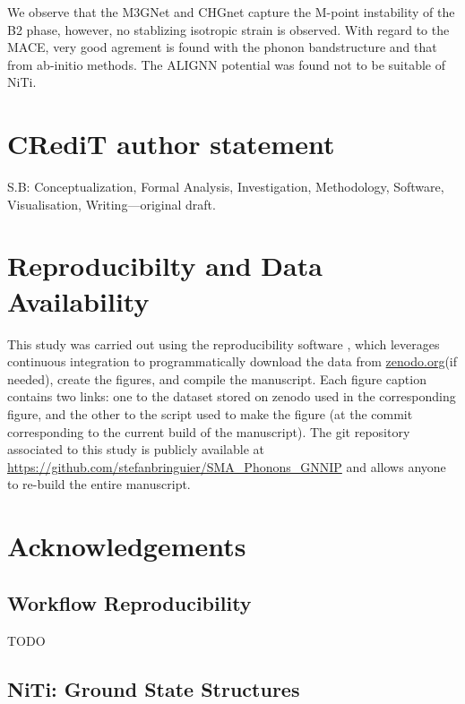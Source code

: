 \documentclass[preprint]{elsarticle}
\begin{document}
We observe that the M3GNet and CHGnet capture the M-point instability of the B2 phase, however, no stablizing isotropic strain is observed. With regard to the MACE, very good agrement is found with the phonon bandstructure and that from ab-initio methods. The ALIGNN potential was found not to be suitable of NiTi.






\section*{CR\lowercase{e}d\lowercase{i}T author statement}

S.B: Conceptualization, Formal Analysis, Investigation, Methodology, Software, Visualisation, Writing---original draft.


\section*{Reproducibilty and Data Availability}
This study was carried out using the reproducibility software \href{https://github.com/showyourwork/showyourwork}{\showyourwork}\cite{Luger2021}, which leverages continuous integration to programmatically download the data from \href{https://zenodo.org/}{zenodo.org}(if needed), create the figures, and compile the manuscript. Each figure caption contains two links: one to the dataset stored on zenodo used in the corresponding figure, and the other to the script used to make the figure (at the commit corresponding to the current build of the manuscript). The git repository associated to this study is publicly available at \url{https://github.com/stefanbringuier/SMA_Phonons_GNNIP} and allows anyone to re-build the entire manuscript.\par

\section*{Acknowledgements}

\newpage
\appendix

\subsection{Workflow Reproducibility}
\label{sec:appx_reproduce}

TODO

\subsection{NiTi: Ground State Structures}
\label{sec:opt_structures}
\end{document}
